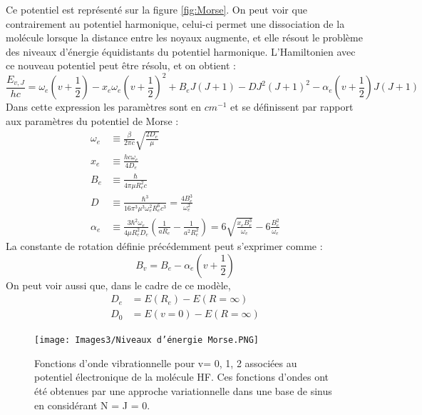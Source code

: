 Ce potentiel est représenté sur la figure \ref{fig:Morse}.
On peut voir que contrairement au potentiel harmonique, celui-ci permet une dissociation de la molécule lorsque la distance entre les noyaux augmente, et elle résout le problème des niveaux d'énergie équidistants du potentiel harmonique.\newline
L'Hamiltonien avec ce nouveau potentiel peut être résolu, et on obtient : 
\begin{equation*}
    \frac{E_{v,J}}{hc} = \omega_e(v+\frac{1}{2})-x_e\omega_e(v+\frac{1}{2})^2+B_eJ(J+1)-DJ^2(J+1)^2-\alpha_e(v+\frac{1}{2})J(J+1)
\end{equation*}
Dans cette expression les paramètres sont en $cm^{-1}$ et se définissent par rapport
aux paramètres du potentiel de Morse :
\begin{equation*}
    \begin{split}
        \omega_e &\equiv \frac{\beta}{2\pi c}\sqrt{\frac{2D_e}{\mu}}\\
        x_e &\equiv \frac{hc\omega_e}{4D_e}\\
        B_e &\equiv \frac{\hbar}{4\pi\mu R_e^2c}\\
        D &\equiv \frac{\hbar^3}{16\pi^3\mu^3\omega_e^2R_e^6c^3} = \frac{4B_e^3}{\omega_e^2}\\
        \alpha_e &\equiv \frac{3\hbar^2\omega_e}{4\mu R_e^2D_e}\left(\frac{1}{aR_e}-\frac{1}{a^2R_e^2}\right) = 6\sqrt{\frac{x_eB_e^3}{\omega_e}}-6\frac{B_e^2}{\omega_e}
    \end{split}
\end{equation*}
La constante de rotation définie précédemment peut s'exprimer comme : 
\begin{equation*}
    B_v = B_e -\alpha_e(v+\frac{1}{2})
\end{equation*}
On peut voir aussi que, dans le cadre de ce modèle, 
\begin{equation*}
    \begin{split}
        D_e &= E(R_e)-E(R=\infty)\\
        D_0 &= E(v=0)-E(R=\infty)
    \end{split}
\end{equation*}
\begin{figure}[ht]
    \centering
    \texttt{[image: Images3/Niveaux d'énergie Morse.PNG]}
    \caption{Fonctions d’onde vibrationnelle pour v= 0, 1, 2 associées au potentiel
électronique de la molécule HF. Ces fonctions d’ondes ont été obtenues par une
approche variationnelle dans une base de sinus en considérant N = J = 0.}
    \label{fig:Niv}
\end{figure}

